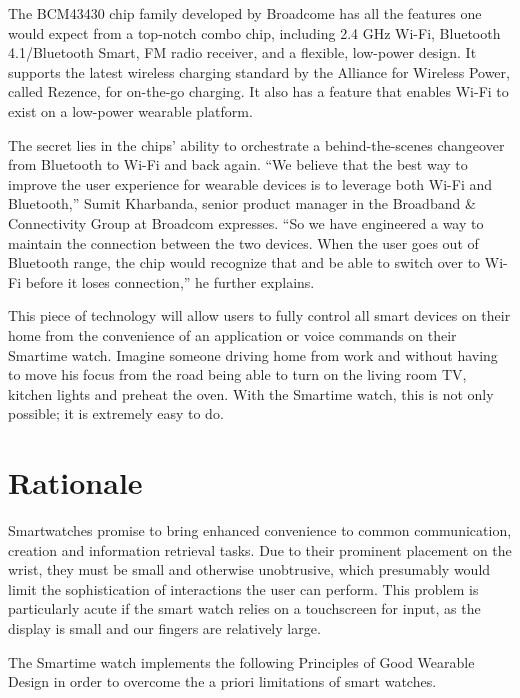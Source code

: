 \documentclass{article}
\begin{document}
The BCM43430 chip family developed by Broadcome has all the features one would expect from a top-notch combo chip, including 2.4 GHz Wi-Fi, Bluetooth 4.1/Bluetooth Smart, FM radio receiver, and a flexible, low-power design. It supports the latest wireless charging standard by the Alliance for Wireless Power, called Rezence, for on-the-go charging. It also has a feature that enables Wi-Fi to exist on a low-power wearable platform.

The secret lies in the chips' ability to orchestrate a behind-the-scenes changeover from Bluetooth to Wi-Fi and back again. ``We believe that the best way to improve the user experience for wearable devices is to leverage both Wi-Fi and Bluetooth,'' Sumit Kharbanda, senior product manager in the Broadband \& Connectivity Group at Broadcom expresses. ``So we have engineered a way to maintain the connection between the two devices. When the user goes out of Bluetooth range, the chip would recognize that and be able to switch over to Wi-Fi before it loses connection,'' he further explains. 

This piece of technology will allow users to fully control all smart devices on their home from the convenience of an application or voice commands on their Smartime watch. Imagine someone driving home from work and without having to move his focus from the road being able to turn on the living room TV, kitchen lights and preheat the oven. With the Smartime watch, this is not only possible; it is extremely easy to do.


\section{Rationale}
Smartwatches promise to bring enhanced convenience to common communication, creation and information retrieval tasks. Due to their prominent placement on the wrist, they must be small and otherwise unobtrusive, which presumably would limit the sophistication of interactions the user can perform. This problem is particularly acute if the smart watch relies on a touchscreen for input, as the display is small and our fingers are relatively large. 

The Smartime watch implements the following Principles of Good Wearable Design in order to overcome the a priori limitations of smart watches.
\end{document}
